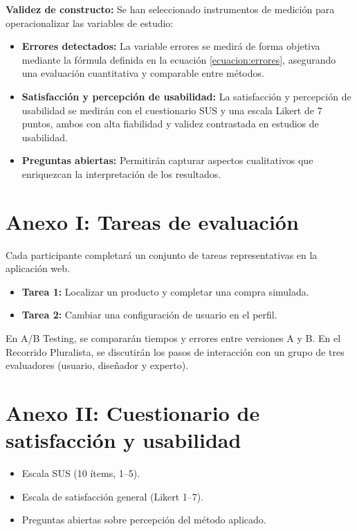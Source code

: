 \documentclass[a4paper,12pt]{report}
\begin{document}
\textbf{Validez de constructo:} Se han seleccionado instrumentos de medición para operacionalizar las variables de estudio: 
\begin{itemize}
    \item \textbf{Errores detectados:} La variable errores se medirá de forma objetiva mediante la fórmula definida en la ecuación \ref{ecuacion:errores}, asegurando una evaluación cuantitativa y comparable entre métodos.
    \item \textbf{Satisfacción y percepción de usabilidad:} La satisfacción y percepción de usabilidad se medirán con el cuestionario SUS y una escala Likert de 7 puntos, ambos con alta fiabilidad y validez contrastada en estudios de usabilidad.
    \item \textbf{Preguntas abiertas:} Permitirán capturar aspectos cualitativos que enriquezcan la interpretación de los resultados.
\end{itemize}

\cleardoublepage

\printbibliography[heading=bibintoc,title={Bibliografía}]
\appendix

\chapter{Anexo I: Tareas de evaluación}
Cada participante completará un conjunto de tareas representativas en la aplicación web.  
\begin{itemize}
    \item \textbf{Tarea 1:} Localizar un producto y completar una compra simulada.  
    \item \textbf{Tarea 2:} Cambiar una configuración de usuario en el perfil.  
\end{itemize}
En A/B Testing, se compararán tiempos y errores entre versiones A y B.  
En el Recorrido Pluralista, se discutirán los pasos de interacción con un grupo de tres evaluadores (usuario, diseñador y experto).

\chapter{Anexo II: Cuestionario de satisfacción y usabilidad}
\label{anexo:encuesta}
\begin{itemize}
    \item Escala SUS (10 ítems, 1--5).  
    \item Escala de satisfacción general (Likert 1--7).  
    \item Preguntas abiertas sobre percepción del método aplicado.  
\end{itemize}
\end{document}
